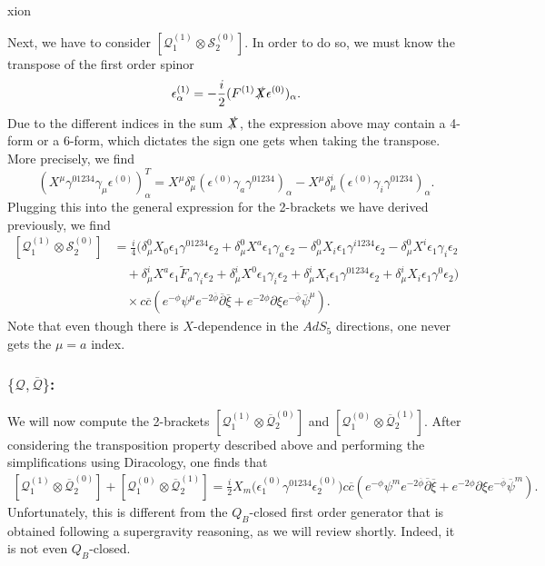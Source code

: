 xion\documentclass[12pt]{article}
\def\be{\begin{equation}}
\def\ee{\end{equation}}
\def\ie{\begin{equation}\begin{aligned}}
\def\fe{\end{aligned}\end{equation}}
\numberwithin{equation}{section}
\newcommand{\WT}[1]{\widetilde{#1}}
\newcommand{\B}[1]{\overline{#1}}
\begin{document}
Next, we have to consider $[\mathcal{Q}_1^{(1)}\otimes\mathcal{S}_2^{(0)}]$.
In order to do so, we must know the transpose of the first order spinor
\be
    \epsilon_{\alpha}^{(1)}=-\frac{i}{2}(F^{(1)}\slashed{X}\epsilon^{(0)})_{\alpha}.
\ee
Due to the different indices in the sum $\slashed{X}$, the expression above may contain a 4-form or a 6-form, which dictates the sign one gets when taking the transpose. More precisely, we find
\be
    (X^{\mu}\gamma^{01234}\gamma_{\mu}\epsilon^{(0)})_{\alpha}^T=X^{\mu}\delta_{\mu}^a(\epsilon^{(0)}\gamma_a\gamma^{01234})_{\alpha}-X^{\mu}\delta_{\mu}^i(\epsilon^{(0)}\gamma_i\gamma^{01234})_{\alpha}.
\ee
Plugging this into the general expression for the 2-brackets we have derived previously, we find
\ie
 [\mathcal{Q}_1^{(1)}\otimes\mathcal{S}_2^{(0)}]&=\frac{i}{4}\Big(\delta_{\mu}^0X_0\epsilon_1\gamma^{01234}\epsilon_2+\delta_{\mu}^0X^a\epsilon_1\gamma_a\epsilon_2-\delta_{\mu}^0X_i\epsilon_1\gamma^{i1234}\epsilon_2-\delta_{\mu}^0X^i\epsilon_1\gamma_i\epsilon_2\\
 &\quad+\delta_{\mu}^iX^a\epsilon_1\WT{F}_a\gamma_i\epsilon_2+\delta_{\mu}^iX^0\epsilon_1\gamma_i\epsilon_2+\delta_{\mu}^iX_i\epsilon_1\gamma^{01234}\epsilon_2+\delta_{\mu}^iX_i\epsilon_1\gamma^0\epsilon_2\Big)\\
 &\quad\times c\B{c}(e^{-\phi}\psi^{\mu}e^{-2\B{\phi}}\B{\partial}\B{\xi}+e^{-2\phi}\partial\xi e^{-\B{\phi}}\B{\psi}^{\mu}).
\fe
Note that even though there is $X$-dependence in the $AdS_5$ directions, one never gets the $\mu=a$ index.

\subsubsection{$\{\mathcal{Q},\B{\mathcal{Q}}\}$:}
We will now compute the 2-brackets $[\mathcal{Q}_1^{(1)}\otimes\B{\mathcal{Q}}_2^{(0)}]$ and $[\mathcal{Q}_1^{(0)}\otimes\B{\mathcal{Q}}_2^{(1)}]$. After considering the transposition property described above and performing the simplifications using Diracology, one finds that
\ie
  [\mathcal{Q}_1^{(1)}\otimes\B{\mathcal{Q}}_2^{(0)}]+[\mathcal{Q}_1^{(0)}\otimes\B{\mathcal{Q}}_2^{(1)}]=\frac{i}{2}X_m\big(\epsilon_{1}^{(0)}\gamma^{01234}\epsilon_{2}^{(0)}\big)c\B{c}(e^{-\phi}\psi^{m}e^{-2\B{\phi}}\B{\partial}\B{\xi}+e^{-2\phi}\partial\xi e^{-\B{\phi}}\B{\psi}^{m}).
\fe
Unfortunately, this is different from the $Q_B$-closed first order generator that is obtained following a supergravity reasoning, as we will review shortly. Indeed, it is not even $Q_B$-closed.
\end{document}
